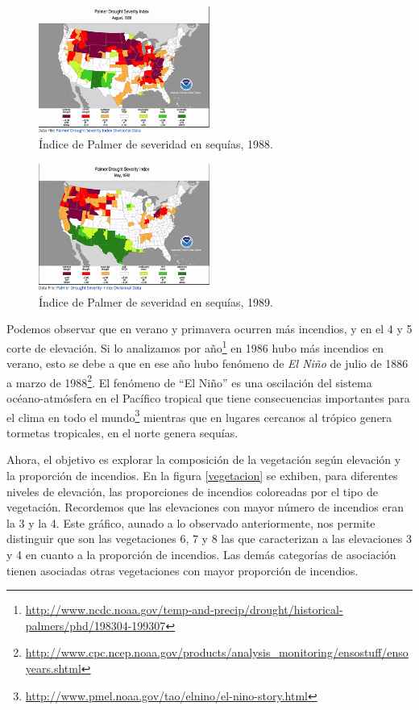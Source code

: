 \documentclass[12,]{article}
\let\rmarkdownfootnote\footnote%
\def\footnote{\protect\rmarkdownfootnote}
\begin{document}
\begin{figure}[H]
\centering
\includegraphics[width=0.5\textwidth]{imagenes/IP88.png}
\caption{Índice de Palmer de severidad en sequías, 1988.}

\end{figure}

\begin{figure}[H]
\centering
\includegraphics[width=0.5\textwidth]{imagenes/IP92.png}
\caption{Índice de Palmer de severidad en sequías, 1989.}

\end{figure}

Podemos observar que en verano y primavera ocurren más incendios, y en
el 4 y 5 corte de elevación. Si lo analizamos por año\footnote{\url{http://www.ncdc.noaa.gov/temp-and-precip/drought/historical-palmers/phd/198304-199307}}
en 1986 hubo más incendios en verano, esto se debe a que en ese año hubo
fenómeno de \emph{El Niño} de julio de 1886 a marzo de 1988\footnote{\url{http://www.cpc.ncep.noaa.gov/products/analysis_monitoring/ensostuff/ensoyears.shtml}}.
El fenómeno de ``El Niño'' es una oscilación del sistema
océano-atmósfera en el Pacífico tropical que tiene consecuencias
importantes para el clima en todo el mundo\footnote{\url{http://www.pmel.noaa.gov/tao/elnino/el-nino-story.html}}
mientras que en lugares cercanos al trópico genera tormetas tropicales,
en el norte genera sequías.

Ahora, el objetivo es explorar la composición de la vegetación según
elevación y la proporción de incendios. En la figura \ref{vegetacion} se
exhiben, para diferentes niveles de elevación, las proporciones de
incendios coloreadas por el tipo de vegetación. Recordemos que las
elevaciones con mayor número de incendios eran la 3 y la 4. Este
gráfico, aunado a lo observado anteriormente, nos permite distinguir que
son las vegetaciones 6, 7 y 8 las que caracterizan a las elevaciones 3 y
4 en cuanto a la proporción de incendios. Las demás categorías de
asociación tienen asociadas otras vegetaciones con mayor proporción de
incendios.
\end{document}
